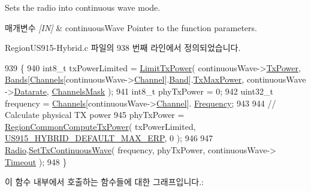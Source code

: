 Sets the radio into continuous wave mode. 


\begin{DoxyParams}{매개변수}
{\em \mbox{[}\+I\+N\mbox{]}} & continuous\+Wave Pointer to the function parameters. \\
\hline
\end{DoxyParams}


Region\+U\+S915-\/\+Hybrid.\+c 파일의 938 번째 라인에서 정의되었습니다.


\begin{DoxyCode}
939 \{
940     int8\_t txPowerLimited = \mbox{\hyperlink{_region_u_s915-_hybrid_8c_af2821991c6e6dad3e196b01f6cf1d542}{LimitTxPower}}( continuousWave->\mbox{\hyperlink{structs_continuous_wave_params_a037b4f849fa8ed4aa1d3c58aef2b28ec}{TxPower}}, 
      \mbox{\hyperlink{_region_u_s915-_hybrid_8c_acdf8c87a5e1e73b468dbf151f92e2273}{Bands}}[\mbox{\hyperlink{_region_u_s915-_hybrid_8c_a2781ea69a73fdddcc54719ec4775751f}{Channels}}[continuousWave->\mbox{\hyperlink{structs_continuous_wave_params_a1ca6f01ca18afe402de51babe8c95f5e}{Channel}}].\mbox{\hyperlink{structs_channel_params_a724c03aa06953111c3291243831f251b}{Band}}].\mbox{\hyperlink{structs_band_a1b9d27384fedab3a94167b8e9bf9b432}{TxMaxPower}}, continuousWave
      ->\mbox{\hyperlink{structs_continuous_wave_params_ae2f6080f3aa0e9485c55513ca56bb24d}{Datarate}}, \mbox{\hyperlink{_region_u_s915-_hybrid_8c_a2188957b5ca6af8092154d7ccbfa5757}{ChannelsMask}} );
941     int8\_t phyTxPower = 0;
942     uint32\_t frequency = \mbox{\hyperlink{_region_u_s915-_hybrid_8c_a2781ea69a73fdddcc54719ec4775751f}{Channels}}[continuousWave->\mbox{\hyperlink{structs_continuous_wave_params_a1ca6f01ca18afe402de51babe8c95f5e}{Channel}}].
      \mbox{\hyperlink{structs_channel_params_ade3d190636488dad9a89b19446b7acf1}{Frequency}};
943 
944     \textcolor{comment}{// Calculate physical TX power}
945     phyTxPower = \mbox{\hyperlink{group___r_e_g_i_o_n_c_o_m_m_o_n_gaa92800c8e9ce21366d383d14878cc391}{RegionCommonComputeTxPower}}( txPowerLimited, 
      \mbox{\hyperlink{group___r_e_g_i_o_n_u_s915_h_y_b_gac045f9e8230d0740b4676fbade801432}{US915\_HYBRID\_DEFAULT\_MAX\_ERP}}, 0 );
946 
947     \mbox{\hyperlink{sx1276mb1las_8c_acf9fe61a72c16fa29a0dc449d23e3820}{Radio}}.\mbox{\hyperlink{struct_radio__s_a33dccb0bc830d9a68ec0c2e75b74e541}{SetTxContinuousWave}}( frequency, phyTxPower, continuousWave->
      \mbox{\hyperlink{structs_continuous_wave_params_ae1c58f120c7eef7bb71a5e3bfeaeb795}{Timeout}} );
948 \}
\end{DoxyCode}
이 함수 내부에서 호출하는 함수들에 대한 그래프입니다.\+:
\mbox{\label{group___r_e_g_i_o_n_u_s915_h_y_b_gaad87151c4921c1caae24b3b8bb4135b9}} 
